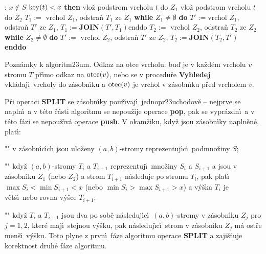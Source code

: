 \phantom{---}{\bf V\'ystup}: $x\notin S$\newline 
\phantom{---}{\bf if} $\operatorname{key}(t)<x$ {\bf then}\newline 
\phantom{------}vlo\v z podstrom vrcholu $t$ do $Z_1$\newline 
\phantom{---}{\bf else}\newline 
\phantom{------}vlo\v z podstrom vrcholu $t$ do $Z_2$\newline 
\phantom{---}{\bf endif\newline 
endif}\newline 
$T_1:=\text{ vrchol }Z_1$, odstra\v n $T_1$ ze $Z_1$\newline 
{\bf while} $Z_1\ne\emptyset$ {\bf do}\newline 
\phantom{---}$T':=$vrchol $Z_1$, odstra\v n $T'$ ze $Z_1$, $T_1:=${\bf JOIN}$(T',T_1)$\newline enddo\newline 
$T_2:=\text{ vrchol }Z_2$, odstra\v n $T_2$ ze $Z_2$\newline 
{\bf while} $Z_2\ne\emptyset$ {\bf do}\newline 
$T':=\text{ vrchol }Z_2$, odstra\v n $T'$ ze $Z_2$, $T_2:=${\bf JOIN$(T_2,T')$\newline 
enddo}
\medskip

\flushpar Pozn\'amky k algoritm\accent23um. \newline 
Odkaz na otce vrcholu: bu\v d je v ka\v zd\'em vrcholu $v$ 
stromu $T$ p\v r\'\i mo odkaz na $\operatorname{otec}(v)$, nebo se v procedu\v re 
{\bf Vyhledej} vkl\'ada\-j\'\i\ vrcholy do z\'asobn\'\i ku a $\operatorname{otec}
(v)$ 
je vrchol v z\'asobn\'\i ku p\v red vrcholem $v$.
\smallskip

\flushpar P\v ri operaci {\bf SPLIT} se z\'asobn\'\i ky pou\v z\'\i vaj\'\i\ 
jednopr\accent23uchodov\v e -- nejprve se napln\'\i\ a v t\'eto \v c\'asti 
algoritmu se nepou\v zije operace {\bf pop}, pak se vypr\'azdn\'\i\ a v t\'eto 
f\'azi se nepou\v z\'\i v\'a operace {\bf push}. V okam\v ziku, kdy\v z jsou 
z\'asobn\'\i ky napln\v en\'e, plat\'\i :
\roster
\item"{}"
v z\'asobn\'\i c\'\i ch jsou ulo\v zeny $(a,b)$-stromy reprezentuj\'\i c\'\i\ 
podmno\v ziny $S$;
\item"{}" 
kdy\v z $(a,b)$-stromy $T_i$ a $T_{i+1}$ reprezentuj\'\i\ mno\v ziny $S_
i$ a $S_{i+1}$ a jsou v z\'a\-sobn\'\i ku $Z_1$ (nebo $Z_2$) a strom $T_{i+1}$ n\'asleduje 
po stromu $T_{i}$, pak plat\'\i\ $\max S_i<\min S_{i+1}<x$ (nebo 
$\min S_i>\max S_{i+1}>x$) a v\'y\v ska $T_i$ je v\v et\v s\'\i\ nebo 
rovna v\'y\v sce $T_{i+1}$;
\item"{}"
kdy\v z $T_i$ a $T_{i+1}$ jsou dva po sob\v e n\'asleduj\'\i c\'\i\ $
(a,b)$-stromy v 
z\'asobn\'\i ku $Z_j$ pro $j=1,2$, kter\'e maj\'\i\ stejnou v\'y\v sku, pak 
n\'asleduj\'\i c\'\i\ strom v z\'asobn\'\i ku $Z_j$ m\'a ost\v re men\v s\'\i\ v\'y\v sku.
\endroster
\flushpar Toto plyne z prvn\'\i\ f\'aze algoritmu operace {\bf SPLIT} a zaji\v s\v tuje 
korektnost druh\'e f\'aze algoritmu. 
\medskip

